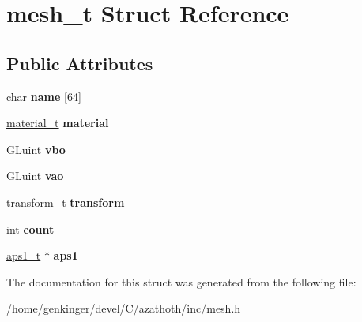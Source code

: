\hypertarget{structmesh__t}{}\section{mesh\+\_\+t Struct Reference}
\label{structmesh__t}
\subsection*{Public Attributes}
\begin{DoxyCompactItemize}
\item 
\mbox{\label{structmesh__t_aab3f427102ddb6e5870d4d1a6c108279}} 
char {\bfseries name} \mbox{[}64\mbox{]}
\item 
\mbox{\label{structmesh__t_ada8c6fafdf4ca6e35ca0b0f3828c8fdf}} 
\mbox{\hyperlink{structmaterial__t}{material\+\_\+t}} {\bfseries material}
\item 
\mbox{\label{structmesh__t_a7c7ff0a17a0e63ebda16e0de0908de01}} 
G\+Luint {\bfseries vbo}
\item 
\mbox{\label{structmesh__t_ad23b3210eb7c56a9e472bec403ebc8f8}} 
G\+Luint {\bfseries vao}
\item 
\mbox{\label{structmesh__t_a7a9aada1bc807f236d374c702fbf8fd6}} 
\mbox{\hyperlink{structtransform__t}{transform\+\_\+t}} {\bfseries transform}
\item 
\mbox{\label{structmesh__t_a10ba674a6861320b103fade041f5d9e6}} 
int {\bfseries count}
\item 
\mbox{\label{structmesh__t_acec296ed16b0681aeee51b8241bd381d}} 
\mbox{\hyperlink{structaps1__t}{aps1\+\_\+t}} $\ast$ {\bfseries aps1}
\end{DoxyCompactItemize}


The documentation for this struct was generated from the following file\+:\begin{DoxyCompactItemize}
\item 
/home/genkinger/devel/\+C/azathoth/inc/mesh.\+h\end{DoxyCompactItemize}
